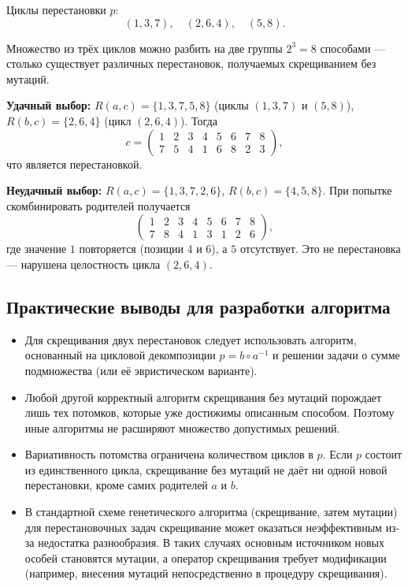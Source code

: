 \documentclass[732]{studrep}
\theoremstyle{nonumberplain}
\begin{document}
Циклы перестановки $p$:
\[
(1,3,7),\quad (2,6,4),\quad (5,8).
\]

Множество из трёх циклов можно разбить на две группы $2^3 = 8$ способами — столько существует различных перестановок, получаемых скрещиванием без мутаций.

\textbf{Удачный выбор:} $R(a,c) = \{1,3,7,5,8\}$ (циклы $(1,3,7)$ и $(5,8)$), $R(b,c) = \{2,6,4\}$ (цикл $(2,6,4)$). Тогда
\[
c = \begin{pmatrix}
1 & 2 & 3 & 4 & 5 & 6 & 7 & 8\\
7 & 5 & 4 & 1 & 6 & 8 & 2 & 3
\end{pmatrix},
\]
что является перестановкой.

\textbf{Неудачный выбор:} $R(a,c) = \{1,3,7,2,6\}$, $R(b,c) = \{4,5,8\}$. При попытке скомбинировать родителей получается
\[
\begin{pmatrix}
1 & 2 & 3 & 4 & 5 & 6 & 7 & 8\\
7 & 8 & 4 & 1 & 3 & 1 & 2 & 6
\end{pmatrix},
\]
где значение $1$ повторяется (позиции 4 и 6), а $5$ отсутствует. Это не перестановка — нарушена целостность цикла $(2,6,4)$.

\subsection{Практические выводы для разработки алгоритма}
\label{sec:practical_conclusions_crossover}

\begin{itemize}
\item Для скрещивания двух перестановок следует использовать алгоритм, основанный на цикловой декомпозиции $p = b\circ a^{-1}$ и решении задачи о сумме подмножества (или её эвристическом варианте).
\item Любой другой корректный алгоритм скрещивания без мутаций порождает лишь тех потомков, которые уже достижимы описанным способом. Поэтому иные алгоритмы не расширяют множество допустимых решений.
\item Вариативность потомства ограничена количеством циклов в $p$. Если $p$ состоит из единственного цикла, скрещивание без мутаций не даёт ни одной новой перестановки, кроме самих родителей $a$ и $b$.
\item В стандартной схеме генетического алгоритма (скрещивание, затем мутации) для перестановочных задач скрещивание может оказаться неэффективным из-за недостатка разнообразия. В таких случаях основным источником новых особей становятся мутации, а оператор скрещивания требует модификации (например, внесения мутаций непосредственно в процедуру скрещивания).
\end{itemize}
\end{document}
